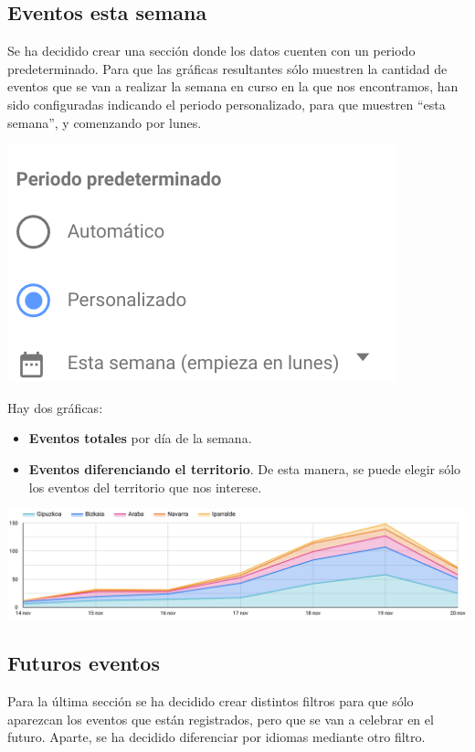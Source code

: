 \documentclass{\ClassPath/viu-tfm-template}
\begin{document}
\subsection{Eventos esta semana}

Se ha decidido crear una sección donde los datos cuenten con un periodo predeterminado. Para que las gráficas resultantes sólo muestren la cantidad de eventos que se van a realizar la semana en curso en la que nos encontramos, han sido configuradas indicando el periodo personalizado, para que muestren “esta semana”, y comenzando por lunes.

\begin{center}
    \includegraphics[frame,width=0.4\linewidth]{img/periodo.png}
\end{center}

Hay dos gráficas:

\begin{itemize}
    \item \textbf{Eventos totales} por día de la semana.
    \item \textbf{Eventos diferenciando el territorio}. De esta manera, se puede elegir sólo los eventos del territorio que nos interese.
\end{itemize}

\begin{center}
    \includegraphics[width=0.9\linewidth]{img/semana.png}
\end{center}


\subsection{Futuros eventos}

Para la última sección se ha decidido crear distintos filtros para que sólo aparezcan los eventos que están registrados, pero que se van a celebrar en el futuro. Aparte, se ha decidido diferenciar por idiomas mediante otro filtro.
\end{document}
